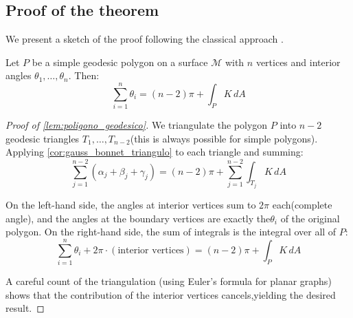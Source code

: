 \subsection{Proof of the theorem}\label{subsec:gauss_bonnet_demostracion}

We present a sketch of the proof following the classical approach \citep{do1976differential,lee2018introduction}.

\begin{lemma}\label{lem:poligono_geodesico}
Let $P$ be a simple geodesic polygon on a surface $\mathcal{M}$ with $n$ vertices and interior angles $\theta_1, \ldots, \theta_n$. Then:
\begin{equation}\label{eq:poligono_geodesico}
\sum_{i=1}^n \theta_i = (n-2)\pi + \int_P K \, dA
\end{equation}
\end{lemma}

\begin{proof}[Proof of \autoref{lem:poligono_geodesico}]We triangulate the polygon $P$ into $n-2$ geodesic triangles $T_1, \ldots, T_{n-2}$(this is always possible for simple polygons). Applying \autoref{cor:gauss_bonnet_triangulo} to each triangle and summing:
\[
\sum_{j=1}^{n-2} (\alpha_j + \beta_j + \gamma_j) = (n-2)\pi + \sum_{j=1}^{n-2} \int_{T_j} K \, dA
\]

On the left-hand side, the angles at interior vertices sum to $2\pi$ each(complete angle), and the angles at the boundary vertices are exactly the$\theta_i$ of the original polygon. On the right-hand side, the sum of integrals is the integral over all of $P$:
\[
\sum_{i=1}^n \theta_i + 2\pi \cdot (\text{interior vertices}) = (n-2)\pi + \int_P K \, dA
\]

A careful count of the triangulation (using Euler's formula for planar graphs) shows that the contribution of the interior vertices cancels,yielding the desired result.
\end{proof}

